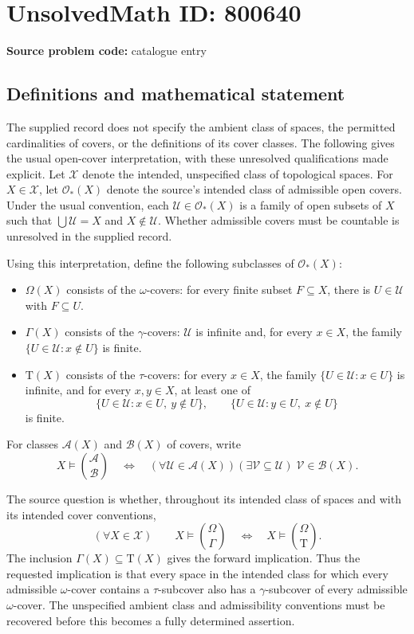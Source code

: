 \documentclass[11pt]{article}
\begin{document}
\section*{UnsolvedMath ID: 800640}
\textbf{Source problem code:} catalogue entry
\subsection{Definitions and mathematical statement}
The supplied record does not specify the ambient class of spaces, the permitted cardinalities of covers, or the definitions of its cover classes. The following gives the usual open-cover interpretation, with these unresolved qualifications made explicit. Let \(\mathscr X\) denote the intended, unspecified class of topological spaces. For \(X\in\mathscr X\), let \(\mathcal O_*(X)\) denote the source's intended class of admissible open covers. Under the usual convention, each \(\mathcal U\in\mathcal O_*(X)\) is a family of open subsets of \(X\) such that \(\bigcup\mathcal U=X\) and \(X\notin\mathcal U\). Whether admissible covers must be countable is unresolved in the supplied record.

Using this interpretation, define the following subclasses of \(\mathcal O_*(X)\):
\begin{itemize}
\item \(\Omega(X)\) consists of the \(\omega\)-covers: for every finite subset \(F\subseteq X\), there is \(U\in\mathcal U\) with \(F\subseteq U\).
\item \(\Gamma(X)\) consists of the \(\gamma\)-covers: \(\mathcal U\) is infinite and, for every \(x\in X\), the family \(\{U\in\mathcal U:x\notin U\}\) is finite.
\item \(\mathrm T(X)\) consists of the \(\tau\)-covers: for every \(x\in X\), the family \(\{U\in\mathcal U:x\in U\}\) is infinite, and for every \(x,y\in X\), at least one of
\[
\{U\in\mathcal U:x\in U,\ y\notin U\},\qquad
\{U\in\mathcal U:y\in U,\ x\notin U\}
\]
is finite.
\end{itemize}
For classes \(\mathcal A(X)\) and \(\mathcal B(X)\) of covers, write
\[
X\models\binom{\mathcal A}{\mathcal B}
\quad\Longleftrightarrow\quad
(\forall\mathcal U\in\mathcal A(X))
(\exists\mathcal V\subseteq\mathcal U)\;
\mathcal V\in\mathcal B(X).
\]

The source question is whether, throughout its intended class of spaces and with its intended cover conventions,
\[
(\forall X\in\mathscr X)\qquad
X\models\binom{\Omega}{\Gamma}
\quad\Longleftrightarrow\quad
X\models\binom{\Omega}{\mathrm T}.
\]
The inclusion \(\Gamma(X)\subseteq\mathrm T(X)\) gives the forward implication. Thus the requested implication is that every space in the intended class for which every admissible \(\omega\)-cover contains a \(\tau\)-subcover also has a \(\gamma\)-subcover of every admissible \(\omega\)-cover. The unspecified ambient class and admissibility conventions must be recovered before this becomes a fully determined assertion.
\end{document}
